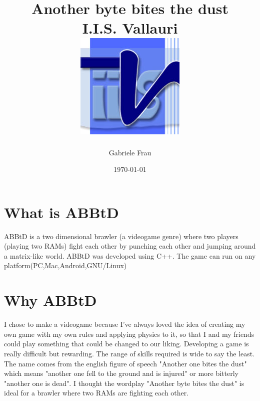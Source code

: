 \documentclass[12pt]{report}
\title	{
		{Another byte bites the dust}	\\
		{\large I.I.S. Vallauri}\\
		{\includegraphics[scale=1.3]{vallauri.jpg}}
}
\author{Gabriele Frau}
\date{\today}
\begin{document}
\maketitle
\section{What is ABBtD}
ABBtD is a two dimensional brawler (a videogame genre) where two players (playing two RAMs) fight each other by punching each other and jumping around a matrix-like world. ABBtD was developed using C++. The game can run on any platform(PC,Mac,Android,GNU/Linux)
\section{Why ABBtD}
I chose to make a videogame because I've always loved the idea of creating my own game with my own rules and applying physics to it, so that I and my friends could play something that could be changed to our liking. Developing a game is really difficult but rewarding. The range of skills required is wide to say the least. The name comes from the english figure of speech "Another one bites the dust" which means "another one fell to the ground and is injured" or more bitterly "another one is dead". I thought the wordplay "Another byte bites the dust" is ideal for a brawler where two RAMs are fighting each other.
\end{document}
